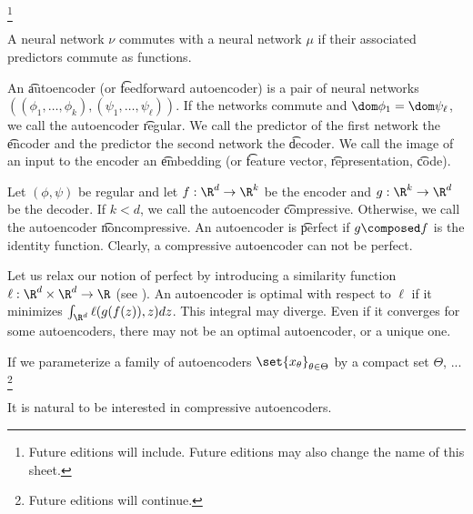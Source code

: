 
\footnote{Future editions will include. Future editions may also change the name of this sheet.}


A neural network $\nu$ commutes with a neural network $\mu$ if their associated predictors commute as functions.

An \t{autoencoder} (or \t{feedforward autoencoder}) is a pair of neural networks $((\phi_1, \dots, \phi_k), (\psi_1, \dots, \psi_\ell))$.
If the networks commute and $\dom \phi_1 = \dom \psi_\ell$, we call the autoencoder \t{regular}.
We call the predictor of the first network the \t{encoder} and the predictor the second network the \t{decoder}.
We call the image of an input to the encoder an \t{embedding} (or \t{feature vector}, \t{representation}, \t{code}).


Let $(\phi, \psi)$ be regular and let $f: \R^d \to \R^k$ be the encoder and $g: \R^k \to \R^d$ be the decoder.
If $k < d$, we call the autoencoder \t{compressive}.
Otherwise, we call the autoencoder \t{noncompressive}.
An autoencoder is \t{perfect} if $g \composed f$ is the identity function.
Clearly, a compressive autoencoder can not be perfect.

Let us relax our notion of perfect by introducing a similarity function $\ell: \R^d \times \R^d \to \R$ (see ).
An autoencoder is optimal with respect to $\ell$ if it minimizes $\int_{\R^d} \ell(g(f(z)), z) dz$.
This integral may diverge.
Even if it converges for some autoencoders, there may not be an optimal autoencoder, or a unique one.

If we parameterize a family of autoencoders $\set{x_{\theta}}_{\theta \in \Theta}$ by a compact set $\Theta$, ... \footnote{Future editions will continue.}

It is natural to be interested in compressive autoencoders.


\blankpage
